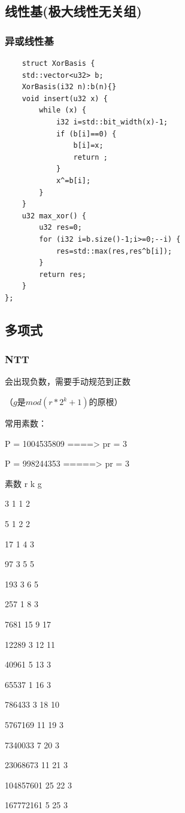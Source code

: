 \documentclass[UTF8,twoside]{ctexart}
\begin{document}
\subsection{线性基(极大线性无关组)}
\subsubsection{异或线性基}
\begin{lstlisting}
    struct XorBasis {
    std::vector<u32> b;
    XorBasis(i32 n):b(n){}
    void insert(u32 x) {
        while (x) {
            i32 i=std::bit_width(x)-1;
            if (b[i]==0) {
                b[i]=x;
                return ;
            }
            x^=b[i];
        }
    }
    u32 max_xor() {
        u32 res=0;
        for (i32 i=b.size()-1;i>=0;--i) {
            res=std::max(res,res^b[i]);
        }
        return res;
    }
};
\end{lstlisting}
\subsection{多项式}
\subsubsection{NTT}
会出现负数，需要手动规范到正数

（$g $是$mod(r*2^k+1)$的原根）

常用素数：

P = 1004535809  ====>  pr = 3

P = 998244353  =====>  pr = 3

素数  r  k  g

3   1   1   2

5   1   2   2

17  1   4   3

97  3   5   5

193 3   6   5

257 1   8   3

7681    15  9   17

12289   3   12  11

40961   5   13  3

65537   1   16  3

786433  3   18  10

5767169 11  19  3

7340033 7   20  3

23068673    11  21  3

104857601   25  22  3

167772161   5   25  3
\end{document}
